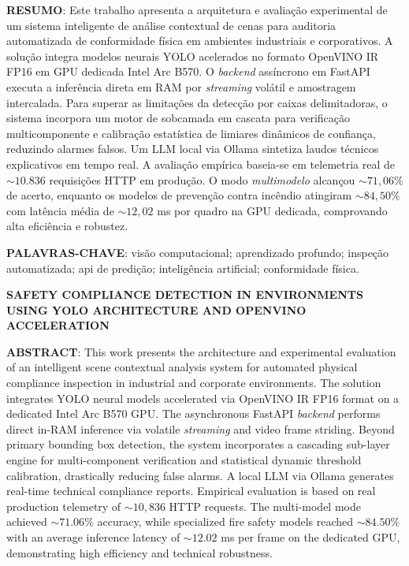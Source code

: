 \documentclass[a4paper,11pt]{article}
\begin{document}

\noindent\textbf{RESUMO}: Este trabalho apresenta a arquitetura e avaliação experimental de um sistema inteligente de análise contextual de cenas para auditoria automatizada de conformidade física em ambientes industriais e corporativos. A solução integra modelos neurais YOLO acelerados no formato OpenVINO IR FP16 em GPU dedicada Intel Arc B570. O \textit{backend} assíncrono em FastAPI executa a inferência direta em RAM por \textit{streaming} volátil e amostragem intercalada. Para superar as limitações da detecção por caixas delimitadoras, o sistema incorpora um motor de sobcamada em cascata para verificação multicomponente e calibração estatística de limiares dinâmicos de confiança, reduzindo alarmes falsos. Um LLM local via Ollama sintetiza laudos técnicos explicativos em tempo real. A avaliação empírica baseia-se em telemetria real de $\sim 10.836$ requisições HTTP em produção. O modo \textit{multimodelo} alcançou $\sim 71{,}06\%$ de acerto, enquanto os modelos de prevenção contra incêndio atingiram $\sim 84{,}50\%$ com latência média de $\sim 12{,}02$ ms por quadro na GPU dedicada, comprovando alta eficiência e robustez.

\vspace{0.15cm}
\noindent\textbf{PALAVRAS-CHAVE}: visão computacional; aprendizado profundo; inspeção automatizada; api de predição; inteligência artificial; conformidade física.

\vspace{0.15cm}
\begin{center}
\textbf{SAFETY COMPLIANCE DETECTION IN ENVIRONMENTS USING YOLO ARCHITECTURE AND OPENVINO ACCELERATION}
\end{center}

\noindent\textbf{ABSTRACT}: This work presents the architecture and experimental evaluation of an intelligent scene contextual analysis system for automated physical compliance inspection in industrial and corporate environments. The solution integrates YOLO neural models accelerated via OpenVINO IR FP16 format on a dedicated Intel Arc B570 GPU. The asynchronous FastAPI \textit{backend} performs direct in-RAM inference via volatile \textit{streaming} and video frame striding. Beyond primary bounding box detection, the system incorporates a cascading sub-layer engine for multi-component verification and statistical dynamic threshold calibration, drastically reducing false alarms. A local LLM via Ollama generates real-time technical compliance reports. Empirical evaluation is based on real production telemetry of $\sim 10,836$ HTTP requests. The multi-model mode achieved $\sim 71.06\%$ accuracy, while specialized fire safety models reached $\sim 84.50\%$ with an average inference latency of $\sim 12.02$ ms per frame on the dedicated GPU, demonstrating high efficiency and technical robustness.
\end{document}
